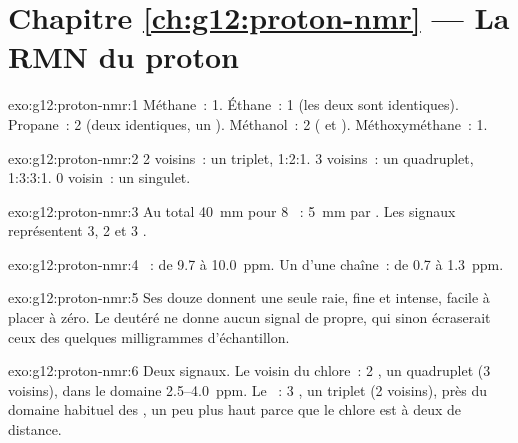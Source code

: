 \section*{Chapitre \ref{ch:g12:proton-nmr} --- La RMN du proton}

\begin{solution}{exo:g12:proton-nmr:1}
Méthane~: 1. Éthane~: 1 (les deux  sont identiques). Propane~: 2
(deux  identiques, un ). Méthanol~: 2 ( et
). Méthoxyméthane~: 1.
\end{solution}

\begin{solution}{exo:g12:proton-nmr:2}
2 voisins~: un triplet, 1:2:1. 3 voisins~: un quadruplet, 1:3:3:1.
0 voisin~: un singulet.
\end{solution}

\begin{solution}{exo:g12:proton-nmr:3}
Au total \qty{40}{mm} pour 8 ~: \qty{5}{mm} par . Les
signaux représentent 3, 2 et 3 .
\end{solution}

\begin{solution}{exo:g12:proton-nmr:4}
~: de 9.7 à \qty{10.0}{ppm}. Un  d'une chaîne~: de 0.7 à
\qty{1.3}{ppm}.
\end{solution}

\begin{solution}{exo:g12:proton-nmr:5}
Ses douze  donnent une seule raie, fine et intense,
facile à placer à zéro. Le  deutéré ne donne aucun signal de
 propre, qui sinon écraserait ceux des quelques milligrammes
d'échantillon.
\end{solution}

\begin{solution}{exo:g12:proton-nmr:6}
Deux signaux. Le  voisin du chlore~: 2 , un quadruplet (3
voisins), dans le domaine 2.5--\qty{4.0}{ppm}. Le ~: 3 ,
un triplet (2 voisins), près du domaine habituel des , un peu
plus haut parce que le chlore est à deux  de distance.
\end{solution}

